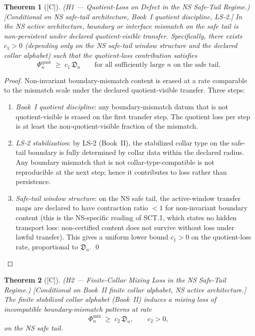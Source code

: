 \documentclass[12pt,oneside]{amsbook}
\theoremstyle{plain}
\newtheorem{theorem}{Theorem}[section]
\theoremstyle{definition}
\theoremstyle{remark}
\newcommand{\status}[1]{\textup{[#1]}}
\begin{document}

\begin{theorem}[\status{C}]\label{thm:NS-H1-quotient-loss}
\textup{(H1 --- Quotient-Loss on Defect in the NS Safe-Tail Regime.)}
\textup{[Conditional on NS safe-tail architecture, Book~I quotient
discipline, LS-2.]}
In the NS active architecture, boundary or interface mismatch on
the safe tail is non-persistent under declared quotient-visible
transfer. Specifically, there exists $c_1 > 0$ (depending only
on the NS safe-tail window structure and the declared collar
alphabet) such that the quotient-loss contribution satisfies
\[
 \Phi_n^{\mathrm{quot}} \;\geq\; c_1\,\mathfrak{D}_n
 \qquad \text{for all sufficiently large } n \text{ on the safe tail.}
\]
\end{theorem}

\begin{proof}
Non-invariant boundary-mismatch content is erased at a rate
comparable to the mismatch scale under the declared
quotient-visible transfer. Three steps:
\begin{enumerate}[label=\textup{(\arabic*)}]
 \item \emph{Book~I quotient discipline}: any boundary-mismatch
 datum that is not quotient-visible is erased on the first
 transfer step. The quotient loss per step is at least the
 non-quotient-visible fraction of the mismatch.
 \item \emph{LS-2 stabilization}: by LS-2 (Book~II), the
 stabilized collar type on the safe-tail boundary is fully
 determined by collar data within the declared radius. Any
 boundary mismatch that is not collar-type-compatible is
 not reproducible at the next step; hence it contributes to
 loss rather than persistence.
 \item \emph{Safe-tail window structure}: on the NS safe tail,
 the active-window transfer maps are declared to have
 contraction ratio $< 1$ for non-invariant boundary content
 (this is the NS-specific reading of SCT.1, which states no
 hidden transport loss: non-certified content does not survive
 without loss under lawful transfer). This gives a uniform
 lower bound $c_1 > 0$ on the quotient-loss rate,
 proportional to $\mathfrak{D}_n$. \qed
\end{enumerate}
\end{proof}

\begin{theorem}[\status{C}]\label{thm:NS-H2-collar-mixing}
\textup{(H2 --- Finite-Collar Mixing Loss in the NS Safe-Tail Regime.)}
\textup{[Conditional on Book~II finite collar alphabet, NS active
architecture.]}
The finite stabilized collar alphabet (Book~II) induces a mixing
loss of incompatible boundary-mismatch patterns at rate
\[
 \Phi_n^{\mathrm{mix}} \;\geq\; c_2\,\mathfrak{D}_n,\qquad c_2 > 0,
\]
on the NS safe tail.
\end{theorem}
\end{document}
